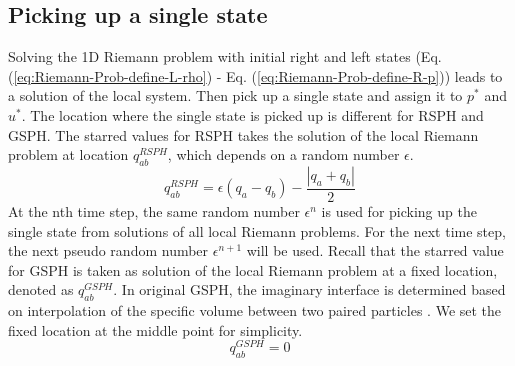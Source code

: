 \subsection{Picking up a single state} \label{sec:Picking-up-single-state}
Solving the 1D Riemann problem with initial right and left states (Eq. (\ref{eq:Riemann-Prob-define-L-rho}) - Eq. (\ref{eq:Riemann-Prob-define-R-p})) leads to a solution of the local system. Then pick up a single state and assign it to $p^{\ast}$ and $u^{\ast}$. The location where the single state is picked up is different for RSPH and GSPH. The starred values for RSPH takes the solution of the local Riemann problem at location $q_{ab}^{RSPH}$, which depends on a random number $\epsilon$. 
\begin{equation}
q_{ab}^{RSPH}=\epsilon \left( q_a - q_b \right) - \frac{| q_a + q_b|}{2}
\label{eq:sample-location-RSPH}
\end{equation}
At the nth time step, the same random number $\epsilon^n$ is used for picking up the single state from solutions of all local Riemann problems. For the next time step, the next pseudo random number $\epsilon^{n+1}$ will be used.
Recall that the starred value for GSPH is taken as solution of the local Riemann problem at a fixed location, denoted as $q_{ab}^{GSPH}$. In original GSPH, the imaginary interface is determined based on interpolation of the specific volume between two paired particles \citep{inutsuka2002reformulation}. We set the fixed location at the middle point \citep{cha2003implementations} for simplicity. 
\begin{equation}
q_{ab}^{GSPH}= 0
\label{eq:sample-location-GSPH}
\end{equation} 

